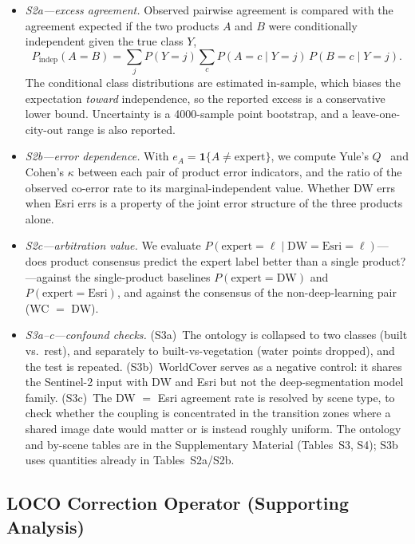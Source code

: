 \begin{itemize}[leftmargin=*]
\item \emph{S2a---excess agreement.} Observed pairwise agreement is compared
  with the agreement expected if the two products $A$ and $B$ were conditionally
  independent given the true class $Y$,
  \begin{equation}\label{eq:condindep}
  P_{\text{indep}}(A = B) = \sum_{j} P(Y = j) \sum_{c} P(A = c \mid Y = j)\,P(B = c \mid Y = j).
  \end{equation}
  The conditional class distributions are estimated in-sample, which biases the
  expectation \emph{toward} independence, so the reported excess is a
  conservative lower bound. Uncertainty is a 4000-sample point bootstrap, and a
  leave-one-city-out range is also reported.
\item \emph{S2b---error dependence.} With $e_{A} = \mathbf{1}\{A \neq
  \text{expert}\}$, we compute Yule's $Q$~\citep{yule1900} and Cohen's $\kappa$
  between each pair of product error indicators, and the ratio of the observed
  co-error rate to its marginal-independent value. Whether DW errs when Esri
  errs is a property of the joint error structure of the three products alone.
\item \emph{S2c---arbitration value.} We evaluate
  $P(\text{expert} = \ell \mid \text{DW} = \text{Esri} = \ell)$---does product
  consensus predict the expert label better than a single product?---against the
  single-product baselines $P(\text{expert} = \text{DW})$ and
  $P(\text{expert} = \text{Esri})$, and against the consensus of the
  non-deep-learning pair (WC $=$ DW).
\item \emph{S3a--c---confound checks.} (S3a)~The ontology is collapsed to two
  classes (built vs.\ rest), and separately to built-vs-vegetation (water points
  dropped), and the test is repeated. (S3b)~WorldCover serves as a negative
  control: it shares the Sentinel-2 input with DW and Esri but not the
  deep-segmentation model family. (S3c)~The DW $=$ Esri agreement rate is
  resolved by scene type, to check whether the coupling is concentrated in the
  transition zones where a shared image date would matter or is instead roughly
  uniform. The ontology and by-scene tables are in the
  Supplementary Material (Tables~S3, S4); S3b uses quantities already in
  Tables~S2a/S2b.
\end{itemize}

\subsection{LOCO Correction Operator (Supporting Analysis)}\label{sec:loco}

